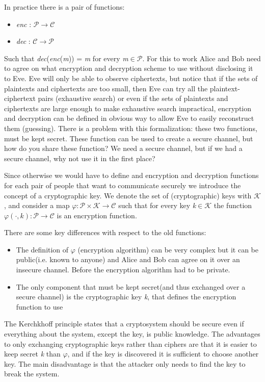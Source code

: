 In practice there is a pair of functions:
\begin{itemize}
	\item \emph{enc} : $\mathcal{P \rightarrow C}$
	\item \emph{dec} : $\mathcal{C \rightarrow P}$
\end{itemize}
Such that \emph{dec}(\emph{enc}(\emph{m})) = \emph{m} for every \emph{m}$\in$$\mathcal{P}$.
For this to work Alice and Bob need to agree on what encryption and decryption scheme to use without disclosing it to Eve. Eve will only be able to observe ciphertexts, but notice that if the sets of plaintexts and ciphertexts are too small, then Eve can try all the plaintext-ciphertext pairs (exhaustive search) or even if the sets of plaintexts and ciphertexts are large enough to make exhaustive search impractical, encryption and decryption can be defined in obvious way to allow Eve to easily reconstruct them (guessing).
There is a problem with this formalization: these two functions, must be kept secret. These function can be used to create a secure channel, but how do you share these function? We need a secure channel, but if we had a secure channel, why not use it in the first place?

Since otherwise we would have to define and encryption and decryption functions for each pair of people that want to communicate securely we introduce the concept of a cryptographic key. We denote the set of (cryptographic) keys with $\mathcal{K}$, and consider a map 
$\varphi : \mathcal{P} \times \mathcal{K} \rightarrow \mathcal{C}$ such that for every key \emph{k}$\in$$\mathcal{K}$ the function $\varphi(\cdot, k) : \mathcal{P} \rightarrow \mathcal{C}$ is an encryption function.

There are some key differences with respect to the old functions:
\begin{itemize}
	\item The definition of $\varphi$ (encryption algorithm) can be very complex but it can be public(i.e. known to anyone) and Alice and Bob can agree on it over an insecure channel. Before the encryption algorithm had to be private.
	\item The only component that must be kept secret(and thus exchanged over a secure channel) is the cryptographic key \emph{k}, that defines the encryption function to use
\end{itemize}

The Kerchkhoff principle states that a cryptosystem should be secure even if everything about the system, except the key, is public knowledge. The advantages to only exchanging cryptographic keys rather than ciphers are that it is easier to keep secret \emph{k} than $\varphi$, and if the key is discovered it is sufficient to choose another key. The main disadvantage is that the attacker only needs to find the key to break the system.

